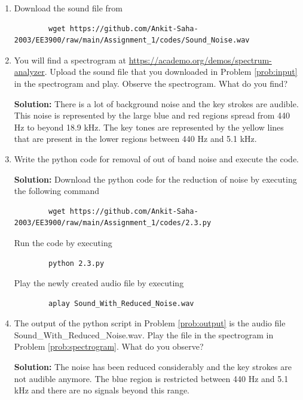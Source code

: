 \documentclass[journal,12pt,twocolumn]{IEEEtran}
\newcommand{\solution}{\noindent \textbf{Solution: }}
\numberwithin{equation}{section}
\renewcommand\thesection{\arabic{section}}
\begin{document}
	\begin{enumerate}[label=\thesection.\arabic*,ref=\thesection.\theenumi]
	\item \label{prob:input} Download the sound file from  
	\begin{lstlisting}
		wget https://github.com/Ankit-Saha-2003/EE3900/raw/main/Assignment_1/codes/Sound_Noise.wav
	\end{lstlisting}
	
	\item \label{prob:spectrogram} You will find a spectrogram at \href{https://academo.org/demos/spectrum-analyzer}{\url{https://academo.org/demos/spectrum-analyzer}}. Upload the sound file that you downloaded in Problem \ref{prob:input} in the spectrogram  and play.  Observe the spectrogram. What do you find?
	
	\solution There is a lot of background noise and the key strokes are audible. This noise is represented by the large blue and red regions spread from 440 Hz to beyond 18.9 kHz. The key tones are represented by the yellow lines that are present in the lower regions between 440 Hz and 5.1 kHz.
	
	\item \label{prob:output} Write the python code for removal of out of band noise and execute the code. 
	
	\solution Download the python code for the reduction of noise by executing the following command
	\begin{lstlisting}
		wget https://github.com/Ankit-Saha-2003/EE3900/raw/main/Assignment_1/codes/2.3.py
	\end{lstlisting}
	
	Run the code by executing
	\begin{lstlisting}
		python 2.3.py
	\end{lstlisting}
	
	Play the newly created audio file by executing
	\begin{lstlisting}
		aplay Sound_With_Reduced_Noise.wav
	\end{lstlisting}
	
	\item The output of the python script in Problem \ref{prob:output} is the audio file Sound\_With\_Reduced\_Noise.wav. Play the file in the spectrogram in Problem \ref{prob:spectrogram}. What do you observe?
	
	\solution The noise has been reduced considerably and the key strokes are not audible anymore. The blue region is restricted between 440 Hz and 5.1 kHz and there are no signals beyond this range.
	
	
	\end{enumerate}
	
\end{document}

